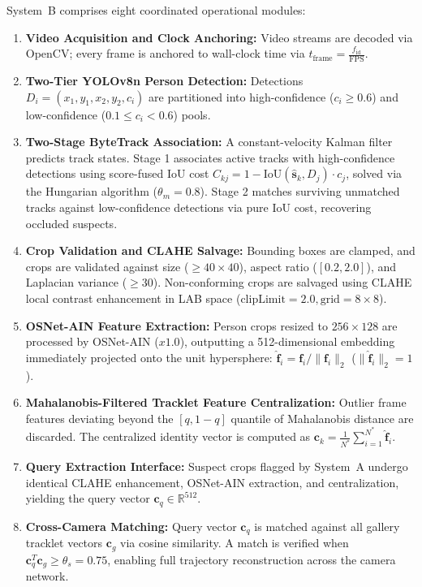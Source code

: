 \documentclass[12pt,a4paper]{report}
\begin{document}
System~B comprises eight coordinated operational modules:
\begin{enumerate}
    \item \textbf{Video Acquisition and Clock Anchoring:} Video streams are decoded via OpenCV; every frame is anchored to wall-clock time via $t_{\text{frame}} = \frac{f_{\text{id}}}{\text{FPS}}$.
    \item \textbf{Two-Tier YOLOv8n Person Detection:} Detections $D_i = (x_1, y_1, x_2, y_2, c_i)$ are partitioned into high-confidence ($c_i \ge 0.6$) and low-confidence ($0.1 \le c_i < 0.6$) pools.
    \item \textbf{Two-Stage ByteTrack Association:} A constant-velocity Kalman filter predicts track states. Stage 1 associates active tracks with high-confidence detections using score-fused IoU cost $C_{kj} = 1 - \text{IoU}(\hat{\mathbf{s}}_k, D_j) \cdot c_j$, solved via the Hungarian algorithm ($\theta_m = 0.8$). Stage 2 matches surviving unmatched tracks against low-confidence detections via pure IoU cost, recovering occluded suspects.
    \item \textbf{Crop Validation and CLAHE Salvage:} Bounding boxes are clamped, and crops are validated against size ($\ge 40 \times 40$), aspect ratio ($[0.2, 2.0]$), and Laplacian variance ($\ge 30$). Non-conforming crops are salvaged using CLAHE local contrast enhancement in LAB space ($\text{clipLimit} = 2.0, \text{grid} = 8 \times 8$).
    \item \textbf{OSNet-AIN Feature Extraction:} Person crops resized to $256 \times 128$ are processed by OSNet-AIN ($x1.0$), outputting a 512-dimensional embedding immediately projected onto the unit hypersphere: $\hat{\mathbf{f}}_i = \mathbf{f}_i / \|\mathbf{f}_i\|_2$ ($\|\hat{\mathbf{f}}_i\|_2 = 1$).
    \item \textbf{Mahalanobis-Filtered Tracklet Feature Centralization:} Outlier frame features deviating beyond the $[q, 1-q]$ quantile of Mahalanobis distance are discarded. The centralized identity vector is computed as $\mathbf{c}_k = \frac{1}{N^*} \sum_{i=1}^{N^*} \hat{\mathbf{f}}_i$.
    \item \textbf{Query Extraction Interface:} Suspect crops flagged by System~A undergo identical CLAHE enhancement, OSNet-AIN extraction, and centralization, yielding the query vector $\mathbf{c}_q \in \mathbb{R}^{512}$.
    \item \textbf{Cross-Camera Matching:} Query vector $\mathbf{c}_q$ is matched against all gallery tracklet vectors $\mathbf{c}_g$ via cosine similarity. A match is verified when $\mathbf{c}_q^T \mathbf{c}_g \ge \theta_s = 0.75$, enabling full trajectory reconstruction across the camera network.
\end{enumerate}
\end{document}
